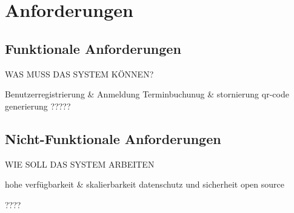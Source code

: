 \section*{Anforderungen}


\subsection{Funktionale Anforderungen}

WAS MUSS DAS SYSTEM KÖNNEN?

Benutzerregistrierung & Anmeldung
Terminbuchunug & stornierung
qr-code generierung 
?????

\subsection{Nicht-Funktionale Anforderungen}

WIE SOLL DAS SYSTEM ARBEITEN

hohe verfügbarkeit & skalierbarkeit
datenschutz und sicherheit
open source

????
